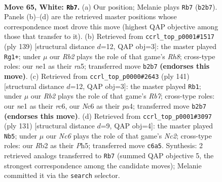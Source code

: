 \documentclass[11pt]{article}
\begin{document}
\clearpage

\begin{figure}[p]\centering
\begin{subfigure}{0.46\textwidth}\centering
\resizebox{\linewidth}{!}{%
\newchessgame
\chessboard[
  setfen={8/8/2Np4/8/5k1p/6p1/1R6/4n1K1 w - - 4 65},
  showmover=false,
  pgfstyle=straightmove, color=movearrow, markmove={b2-b7}
]}
\caption{}
\end{subfigure}\hfill
\begin{subfigure}{0.46\textwidth}\centering
\resizebox{\linewidth}{!}{%
\newchessgame
\chessboard[
  setfen={8/8/5k2/R7/1n3P2/6K1/4P3/7r b - - 2 70},
  showmover=false,
  pgfstyle=straightmove, color=movearrow, markmove={h1-g1}
]}
\caption{}
\end{subfigure}
\\[4pt]
\begin{subfigure}{0.46\textwidth}\centering
\resizebox{\linewidth}{!}{%
\newchessgame
\chessboard[
  setfen={8/8/2R5/p5k1/P7/6KP/1r6/8 b - - 10 71},
  showmover=false,
  pgfstyle=straightmove, color=movearrow, markmove={b2-b1}
]}
\caption{}
\end{subfigure}\hfill
\begin{subfigure}{0.46\textwidth}\centering
\resizebox{\linewidth}{!}{%
\newchessgame
\chessboard[
  setfen={8/2n5/5k2/N6p/4KP2/6P1/8/8 b - - 18 66},
  showmover=false,
  pgfstyle=straightmove, color=movearrow, markmove={c7-b5}
]}
\caption{}
\end{subfigure}
\caption{\textbf{Move 65, White: \texttt{Rb7}.} (a) Our position; Melanie plays \texttt{Rb7} (\texttt{b2b7}). Panels (b)--(d) are the retrieved master positions whose correspondence most drove this move (highest QAP objective among those that transfer to it). (b) Retrieved from \texttt{ccrl\_top\_p0001\#1517} (ply 139) [structural distance $d$=12, QAP obj=3]: the master played \texttt{Rg1+}; under $\mu$ our \emph{Rb2} plays the role of that game's \emph{Rh8}; cross-type roles: our \emph{n}e1 as their \emph{r}a5; transferred move \texttt{b2b7} \textbf{(endorses this move)}. (c) Retrieved from \texttt{ccrl\_top\_p0000\#2643} (ply 141) [structural distance $d$=12, QAP obj=3]: the master played \texttt{Rb1}; under $\mu$ our \emph{Rb2} plays the role of that game's \emph{Rb7}; cross-type roles: our \emph{n}e1 as their \emph{r}c6, our \emph{N}c6 as their \emph{p}a4; transferred move \texttt{b2b7} \textbf{(endorses this move)}. (d) Retrieved from \texttt{ccrl\_top\_p0001\#3097} (ply 131) [structural distance $d$=9, QAP obj=4]: the master played \texttt{Nb5}; under $\mu$ our \emph{Nc6} plays the role of that game's \emph{Nc2}; cross-type roles: our \emph{R}b2 as their \emph{P}h5; transferred move \texttt{c6a5}. Synthesis: 2 retrieved analogs transferred to \texttt{Rb7} (summed QAP objective 5, the strongest correspondence among the candidate moves); Melanie committed it via the \texttt{search} selector.}
\label{fig:thought-m128}
\end{figure}
\end{document}
